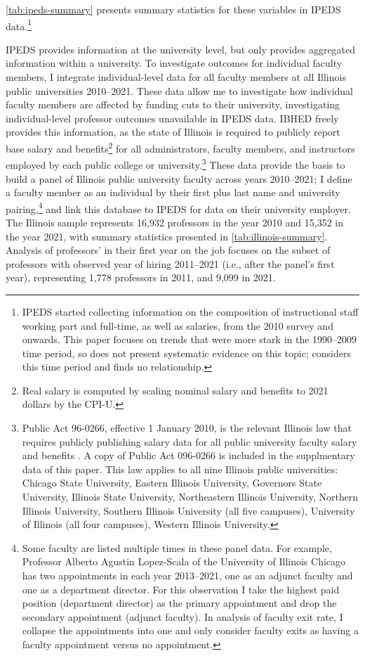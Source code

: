 \autoref{tab:ipeds-summary} presents summary statistics for these variables in IPEDS data.\footnote{
    IPEDS started collecting information on the composition of instructional staff working part and full-time, as well as salaries, from the 2010 survey and onwards.
    This paper focuses on trends that were more stark in the 1990--2009 time period, so does not present systematic evidence on this topic; \cite{hinrichs2022state} considers this time period and finds no relationship.
}

IPEDS provides information at the university level, but only provides aggregated information within a university.
To investigate outcomes for individual faculty members, I integrate individual-level data for all faculty members at all Illinois public universities 2010--2021.
These data allow me to investigate how individual faculty members are affected by funding cuts to their university, investigating individual-level professor outcomes unavailable in IPEDS data.
IBHED freely provides this information, as the state of Illinois is required to publicly report base salary and benefits\footnote{
    Real salary is computed by scaling nominal salary and benefits to 2021 dollars by the CPI-U.
} for all administrators, faculty members, and instructors employed by each public college or university.\footnote{
    Public Act 96-0266, effective 1 January 2010, is the relevant Illinois law that requires publicly publishing salary data for all public university faculty salary and benefits \citep{illinois-public-act}.
    A copy of Public Act 096-0266 is included in the supplmentary data of this paper.
    This law applies to all nine Illinois public universities: Chicago State University, Eastern Illinois University, Governors State University, Illinois State University, Northeastern Illinois University, Northern Illinois University, Southern Illinois University (all five campuses), University of Illinois (all four campuses), Western Illinois University.
}
These data provide the basis to build a panel of Illinois public university faculty across years 2010--2021; I define a faculty member as an individual by their first plus last name and university pairing,\footnote{
    Some faculty are listed multiple times in these panel data.
    For example, Professor Alberto Agustin Lopez-Scala of the University of Illinois Chicago has two appointments in each year 2013--2021, one as an adjunct faculty and one as a department director.
    For this observation I take the highest paid position (department director) as the primary appointment and drop the secondary appointment (adjunct faculty).
    In analysis of faculty exit rate, I collapse the appointments into one and only consider faculty exits as having a faculty appointment versus no appointment.
}
and link this database to IPEDS for data on their university employer.
The Illinois sample represents 16,932 professors in the year 2010 and 15,352 in the year 2021, with summary statistics presented in \autoref{tab:illinois-summary}.
Analysis of professors' in their first year on the job focuses on the subset of professors with observed year of hiring 2011--2021 (i.e., after the panel's first year), representing 1,778 professors in 2011, and 9,099 in 2021.

